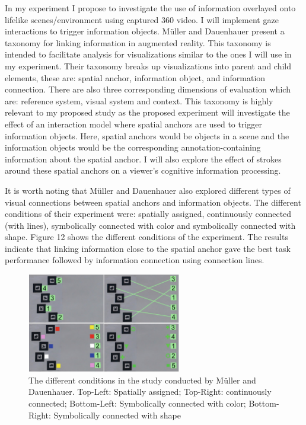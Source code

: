 \documentclass{article}
\begin{document}
In my experiment I propose to investigate the use of information overlayed onto lifelike scenes/environment using captured 360 video. I will implement gaze interactions to trigger information objects. Müller and Dauenhauer \cite{Mller2016} present a taxonomy for linking information in augmented reality. This taxonomy is intended to facilitate analysis for visualizations similar to the ones I will use in my experiment. Their taxonomy breaks up visualizations into parent and child elements, these are: spatial anchor, information object, and information connection. There are also three corresponding dimensions of evaluation which are: reference system, visual system and context. This taxonomy is highly relevant to my proposed study as the proposed experiment will investigate the effect of an interaction model where spatial anchors are used to trigger information objects. Here, spatial anchors would be objects in a scene and the information objects would be the corresponding annotation-containing information about the spatial anchor. I will also explore the effect of strokes around these spatial anchors on a viewer's cognitive information processing. 

It is worth noting that Müller and Dauenhauer also explored different types of visual connections between spatial anchors and information objects. The different conditions of their experiment were: spatially assigned, continuously connected (with lines), symbolically connected with color and symbolically connected with shape. Figure 12 shows  the different conditions of the experiment. The results indicate that linking information close to the spatial anchor gave the best task performance followed by information connection using connection lines.  

\begin{figure}[htbp]
		\hspace{0.2\textwidth}
        \includegraphics[width=0.6\textwidth]{Images/infoLink.jpg}
    	\caption{The different conditions in the study conducted by Müller and Dauenhauer. Top-Left: Spatially assigned; Top-Right: continuously connected; Bottom-Left: Symbolically connected with color; Bottom-Right: Symbolically connected with shape \cite{Mller2016}
}
\end{figure}
\end{document}
